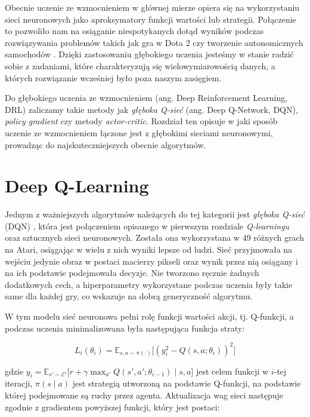 \documentclass[licencjacka]{pracamgr}
\begin{document}
Obecnie uczenie ze wzmocnieniem w głównej mierze opiera się na wykorzystaniu sieci neuronowych jako aproksymatory funkcji wartości lub strategii. Połączenie to pozwoliło nam na osiąganie niespotykanych dotąd wyników podczas rozwiązywania problemów takich jak gra w Dota 2 \cite{dota2} czy tworzenie autonomicznych samochodów \cite{sdc1, sdc2}. Dzięki zastosowaniu głębokiego uczenia jesteśmy w stanie radzić sobie z zadaniami, które charakteryzują się wielowymiarowością danych, a których rozwiązanie wcześniej było poza naszym zasięgiem.

Do głębokiego uczenia ze wzmocnieniem (ang. Deep Reinforcement Learning, DRL) zaliczamy takie metody jak \emph{głęboka Q-sieć} (ang. Deep Q-Network, DQN),  \emph{policy gradient} czy metody \emph{actor-critic}. Rozdział ten opisuje w jaki sposób uczenie ze wzmocnieniem łączone jest z głębokimi sieciami neuronowymi, prowadząc do najskuteczniejszych obecnie algorytmów. 

\section{Deep Q-Learning}

Jednym z ważniejszych algorytmów należących do tej kategorii jest \emph{głęboka Q-sieć} (DQN) \cite{dqn}, która jest połączeniem opisanego w pierwszym rozdziale \emph{Q-learningu} \cite{Q-learning} oraz sztucznych sieci neuronowych. Została ona wykorzystana w 49 różnych grach na Atari, osiągając w wielu z nich wyniki lepsze od ludzi. Sieć przyjmowała na wejściu jedynie obraz w postaci macierzy pikseli oraz wynik przez nią osiągany i na ich podstawie podejmowała decyzje. Nie tworzono ręcznie żadnych dodatkowych cech, a hiperparametry wykorzystane podczas uczenia były takie same dla każdej gry, co wskazuje na dobrą generyczność algorytmu.

W tym modelu sieć neuronowa pełni rolę funkcji wartości akcji, tj. Q-funkcji, a podczas uczenia minimalizowana była następująca funkcja straty:

$$ L_i(\theta_i) = \mathbb{E}_{s, a \sim \pi(\cdot)} \Big[ (y_i^2 - Q(s, a; \theta_i))^2 \Big] $$

gdzie $ y_i = \mathbb{E}_{s' \sim \mathcal{E}'} \big[ r + \gamma \max_{a'} Q(s', a'; \theta_{i - 1}) \mid s, a \big] $ jest celem funkcji w $i$-tej iteracji, $\pi(s \mid a)$ jest strategią utworzoną na podstawie Q-funkcji, na podstawie której podejmowane są ruchy przez agenta. Aktualizacja wag sieci następuje zgodnie z gradientem powyższej funkcji, który jest postaci:
\end{document}

